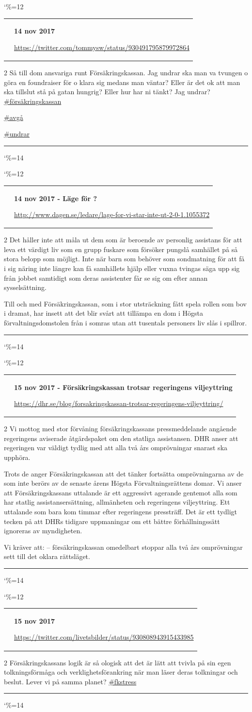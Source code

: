 \documentclass[a4paper]{article}
\makeatletter
\def\hash#1{
\href{http://twitter.com/hashtag/\directlua{tex.print(url_encode('#1'))}}{\##1}
}
\newcommand{\entry}{
\catcode`\%=12
\@entry}
\newcommand{\@entry}[4][]{
\bigskip
\begin{tabular*}{\textwidth}{l m{\textwidth-4cm}}
\qrcode{#4} & \textbf{#2}

\medskip

\url{#4}

\end{tabular*}

\medskip


\begin{multicols}{2}
#3
\end{multicols}

#1

\medskip
\hrule

\catcode`\%=14
}
\makeatother
\begin{document}
{{{{{\entry{14 nov 2017}{Så till dom ansvariga runt Försäkringskassan. Jag undrar ska man va tvungen o göra en foundraiser för o klara sig medans man väntar?
Eller är det ok att man ska tillslut stå på gatan hungrig?
Eller hur har ni tänkt? Jag undrar? \hash{försäkringskassan} \hash{avgå} \hash{undrar}}{https://twitter.com/tommysw/status/930491795879972864}

\entry{14 nov 2017 - Läge för \say{Vi står inte ut 2.0}?}{Det håller inte att måla ut dem som är beroende av personlig assistans för att leva ett värdigt liv som en grupp fuskare som försöker pungslå samhället på så stora belopp som möjligt. Inte när barn som behöver som sondmatning för att få i sig näring inte längre kan få samhällets hjälp eller vuxna tvingas säga upp sig från jobbet samtidigt som deras assistenter får se sig om efter annan sysselsättning.

Till och med Försäkringskassan, som i stor utsträckning fått spela rollen som bov i dramat, har insett att det blir svårt att tillämpa en dom i Högsta förvaltningsdomstolen från i somras utan att tusentals personers liv slås i spillror.}{http://www.dagen.se/ledare/lage-for-vi-star-inte-ut-2-0-1.1055372}




\entry{15 nov 2017 - Försäkringskassan trotsar regeringens viljeyttring}{Vi mottog med stor förvåning försäkringskassans pressmeddelande angående regeringens aviserade åtgärdspaket om den statliga assistansen. DHR anser att regeringen var väldigt tydlig med att alla två års omprövningar snarast ska upphöra.

Trots de anger Försäkringskassan att det tänker fortsätta omprövningarna av de som inte berörs av de senaste årens Högsta Förvaltningsrättens domar. Vi anser att Försäkringskassans uttalande är ett aggressivt agerande gentemot alla som har statlig assistansersättning, allmänheten och regeringens viljeyttring. Ett uttalande som bara kom timmar efter regeringens pressträff. Det är ett tydligt tecken på att DHRs tidigare uppmaningar om ett bättre förhållningssätt ignoreras av myndigheten.

Vi kräver att:
– försäkringskassan omedelbart stoppar alla två års omprövningar sett till det oklara rättsläget.}{https://dhr.se/blog/forsakringskassan-trotsar-regeringens-viljeyttring/}

\entry{15 nov 2017}{Försäkringskassans logik är så ologisk att det är lätt att tvivla på sin egen tolkningsförmåga och verklighetsförankring när man läser deras tolkningar och beslut. Lever vi på samma planet? \hash{fkstress}}{https://twitter.com/livetsbilder/status/930808943915433985}

}}}}}
\end{document}
